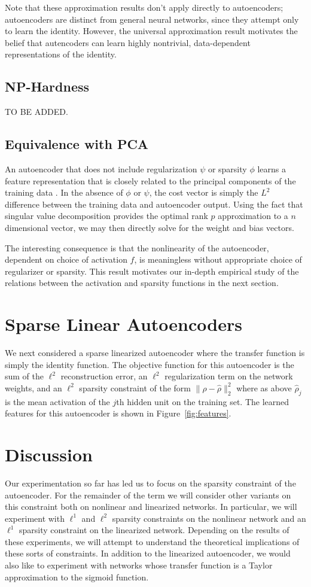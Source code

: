 \documentclass[twocolumn]{article}
\begin{document}
Note that these approximation results don't apply directly to autoencoders; 
autoencoders are distinct from general neural networks, since
they attempt only to learn the identity. However, the universal
approximation result motivates the belief that autencoders can learn
highly nontrivial, data-dependent representations of the identity.

\subsection{NP-Hardness}
TO BE ADDED.

\subsection{Equivalence with PCA}
An autoencoder that does not include regularization $\psi$ or sparsity $\phi$
learns a feature representation that is closely related to the principal
components of the training data \cite{bourlard1988auto}. In the absence of
$\phi$ or $\psi$, the cost vector is simply the $L^2$ difference between the
training data and autoencoder output. Using the fact that singular value
decomposition provides the optimal rank $p$ approximation to a $n$ dimensional
vector, we may then directly solve for the weight and bias vectors.

The interesting consequence is that the nonlinearity of the autoencoder,
dependent on choice of activation $f$, is meaningless without appropriate choice
of regularizer or sparsity. This result motivates our in-depth empirical study
of the relations between the activation and sparsity functions in the next
section.

\section{Sparse Linear Autoencoders}
We next considered a sparse linearized autoencoder where the transfer function
is simply the identity function. The objective function for this autoencoder is
the sum of the $\ell^2$ reconstruction error, an $\ell^2$ regularization term on
the network weights, and an $\ell^2$ sparsity constraint of the form
$\|\rho-\hat\rho\|_2^2$ where as above $\hat\rho_j$ is the mean activation of
the $j$th hidden unit on the training set. The learned features for this
autoencoder is shown in Figure~\ref{fig:features}.

\section{Discussion}
Our experimentation so far has led us to focus on the sparsity constraint of the
autoencoder.  For the remainder of the term we will consider other variants on
this constraint both on nonlinear and linearized networks. In particular, we
will experiment with $\ell^1$ and $\ell^2$ sparsity constraints on the nonlinear
network and an $\ell^1$ sparsity constraint on the linearized network. Depending
on the results of these experiments, we will attempt to understand the
theoretical implications of these sorts of constraints. In addition to the
linearized autoencoder, we would also like to experiment with networks whose
transfer function is a Taylor approximation to the sigmoid function.
\end{document}
